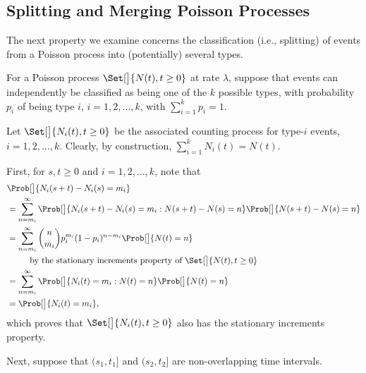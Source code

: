 \subsection*{Splitting and Merging Poisson Processes}
\begin{Regular}
    The next property we examine concerns the classification (i.e., splitting) of events from a
    Poisson process into (potentially) several types.

    \vspace{2mm}

    For a Poisson process $ \Set[\big]{N(t),t\ge 0} $ at rate $ \lambda $, suppose that events can independently
    be classified as being one of the $ k $ possible types, with probability $ p_i $ of being type $ i $, $ i=1,2,\ldots,k $,
    with $ \sum_{i=1}^{k}p_i=1 $.

    \vspace{2mm}

    Let $ \Set[\big]{N_i(t),t\ge 0} $ be the associated counting process for type-$ i $ events, $ i=1,2,\ldots,k $.
    Clearly, by construction, $ \sum_{i=1}^{k}N_i(t)=N(t) $.

    \vspace{2mm}

    First, for $ s,t\ge 0 $ and $ i=1,2,\ldots,k $, note that
    \begin{align*}
         & \Prob[\big]{N_i(s+t)-N_i(s)=m_i}                                                                     \\
         & =\sum_{n=m_i}^{\infty}\Prob[\big]{N_i(s+t)-N_i(s)=m_i\given N(s+t)-N(s)=n}\Prob[\big]{N(s+t)-N(s)=n} \\
         & =\sum_{n=m_i}^{\infty}\binom{n}{m_i}p_i^{m_i}(1-p_i)^{n-m_i}\Prob[\big]{N(t)=n}                      \\
         & \phantom{{}={}}\quad\text{ by the stationary increments property of $ \Set[\big]{N(t),t\ge 0} $}     \\
         & =\sum_{n=m_i}^{\infty}\Prob[\big]{N_i(t)=m_i\given N(t)=n}\Prob[\big]{N(t)=n}                        \\
         & =\Prob[\big]{N_i(t)=m_i},
    \end{align*}
    which proves that $ \Set[\big]{N_i(t),t\ge 0} $ also has the stationary increments property.

    \vspace{2mm}

    Next, suppose that $ (s_1,t_1] $ and $ (s_2,t_2] $ are non-overlapping time intervals.


\end{Regular}
